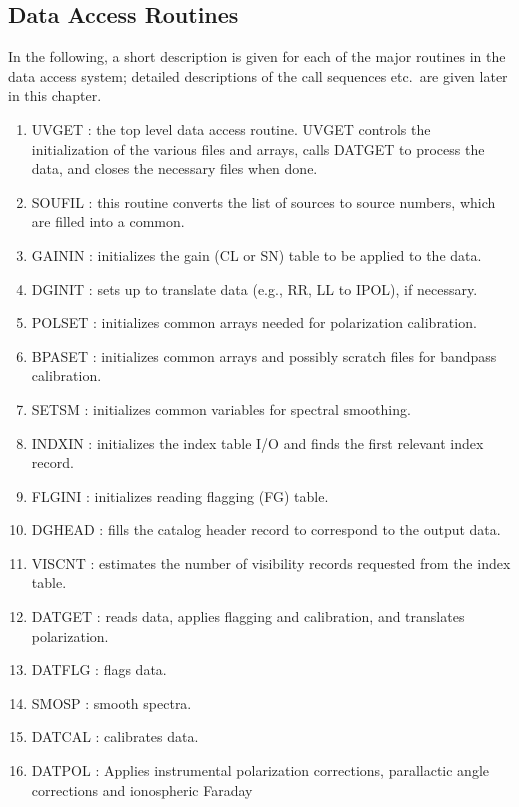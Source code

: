 \subsection{Data Access Routines }
In the following, a short description is given for each of the major
routines in the data access system; detailed descriptions of the call
sequences etc.~are given later in this chapter.
\begin{enumerate} %
\item UVGET : the top level data access routine. UVGET
controls the initialization of the various files and arrays, calls
DATGET to process the data, and closes the necessary files when done.
\item SOUFIL : this routine converts the list of sources
to source numbers, which are filled into a common.
\item GAININ : initializes the gain (CL or SN) table to
be applied to the data.
\item DGINIT : sets up to translate data (e.g., RR, LL
to IPOL), if necessary.
\item POLSET : initializes common arrays needed for
polarization calibration.
\item BPASET : initializes common arrays and possibly
scratch files for bandpass calibration.
\item SETSM : initializes common variables for spectral
smoothing.
\item INDXIN : initializes the index table I/O and finds
the first relevant index record.
\item FLGINI : initializes reading flagging (FG)
table.
\item DGHEAD : fills the catalog header record to
correspond to the output data.
\item VISCNT : estimates the number of visibility
records requested from the index table.
\item DATGET : reads data, applies flagging and
calibration, and translates polarization.
\item DATFLG : flags data.
\item SMOSP : smooth spectra.
\item DATCAL : calibrates data.
\item DATPOL : Applies instrumental polarization
corrections, parallactic angle corrections and ionospheric Faraday

\end{enumerate}
